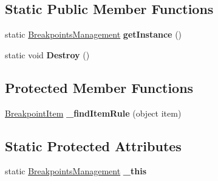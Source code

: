 \subsection*{Static Public Member Functions}
\begin{DoxyCompactItemize}
\item 
\hypertarget{classlib_watcher_dialog_1_1_property_item_1_1_break_point_1_1_breakpoints_management_a569e5781d466fa199d3d46bab3a46fb5}{static \hyperlink{classlib_watcher_dialog_1_1_property_item_1_1_break_point_1_1_breakpoints_management}{Breakpoints\+Management} {\bfseries get\+Instance} ()}\label{classlib_watcher_dialog_1_1_property_item_1_1_break_point_1_1_breakpoints_management_a569e5781d466fa199d3d46bab3a46fb5}

\item 
\hypertarget{classlib_watcher_dialog_1_1_property_item_1_1_break_point_1_1_breakpoints_management_a6725190a422aa3301f76c2eabad8068d}{static void {\bfseries Destroy} ()}\label{classlib_watcher_dialog_1_1_property_item_1_1_break_point_1_1_breakpoints_management_a6725190a422aa3301f76c2eabad8068d}

\end{DoxyCompactItemize}
\subsection*{Protected Member Functions}
\begin{DoxyCompactItemize}
\item 
\hypertarget{classlib_watcher_dialog_1_1_property_item_1_1_break_point_1_1_breakpoints_management_ab4bb00b88806e82378b985db685178d4}{\hyperlink{classlib_watcher_dialog_1_1_property_item_1_1_break_point_1_1_breakpoint_item}{Breakpoint\+Item} {\bfseries \+\_\+find\+Item\+Rule} (object item)}\label{classlib_watcher_dialog_1_1_property_item_1_1_break_point_1_1_breakpoints_management_ab4bb00b88806e82378b985db685178d4}

\end{DoxyCompactItemize}
\subsection*{Static Protected Attributes}
\begin{DoxyCompactItemize}
\item 
\hypertarget{classlib_watcher_dialog_1_1_property_item_1_1_break_point_1_1_breakpoints_management_acac083de39b094fea6894ec32230be60}{static \hyperlink{classlib_watcher_dialog_1_1_property_item_1_1_break_point_1_1_breakpoints_management}{Breakpoints\+Management} {\bfseries \+\_\+this}}\label{classlib_watcher_dialog_1_1_property_item_1_1_break_point_1_1_breakpoints_management_acac083de39b094fea6894ec32230be60}

\end{DoxyCompactItemize}
